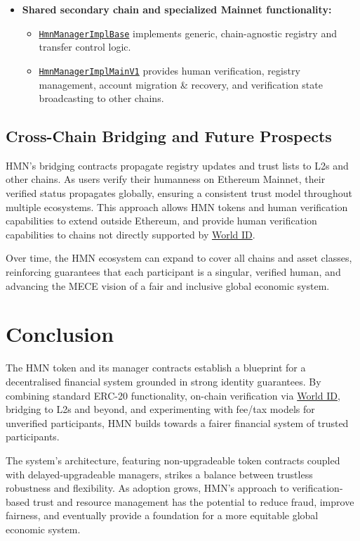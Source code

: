 \documentclass[12pt,a4paper]{article}
\begin{document}
\begin{itemize}
    \item \textbf{Shared secondary chain and specialized Mainnet functionality:}
          \begin{itemize}
              \item \texttt{\href{https://github.com/hmn-is/hmn-contracts/blob/main/src/HmnManagerImplBase.sol}{HmnManagerImplBase}} implements generic, chain-agnostic registry and transfer control logic.
              \item \texttt{\href{https://github.com/hmn-is/hmn-contracts/blob/main/src/HmnManagerImplMainV1.sol}{HmnManagerImplMainV1}} provides human verification, registry management, account migration \& recovery, and verification state broadcasting to other chains.
          \end{itemize}
\end{itemize}

\subsection{Cross-Chain Bridging and Future Prospects}
HMN's bridging contracts propagate registry updates and trust lists to L2s and other chains.
As users verify their humanness on Ethereum Mainnet, their verified status propagates globally, ensuring a consistent trust model throughout multiple ecosystems.
This approach allows HMN tokens and human verification capabilities to extend outside Ethereum, and provide human verification capabilities to chains not directly supported by \href{https://world.org/world-id}{World ID}.

Over time, the HMN ecosystem can expand to cover all chains and asset classes, reinforcing guarantees that each participant is a singular, verified human, and advancing the MECE vision of a fair and inclusive global economic system.

\section{Conclusion}
The HMN token and its manager contracts establish a blueprint for a decentralised financial system grounded in strong identity guarantees.
By combining standard ERC-20 functionality, on-chain verification via \href{https://world.org/world-id}{World ID}, bridging to L2s and beyond, and experimenting with fee/tax models for unverified participants, HMN builds towards a fairer financial system of trusted participants.

The system's architecture, featuring non-upgradeable token contracts coupled with delayed-upgradeable managers, strikes a balance between trustless robustness and flexibility.
As adoption grows, HMN's approach to verification-based trust and resource management has the potential to reduce fraud, improve fairness, and eventually provide a foundation for a more equitable global economic system.
\end{document}

